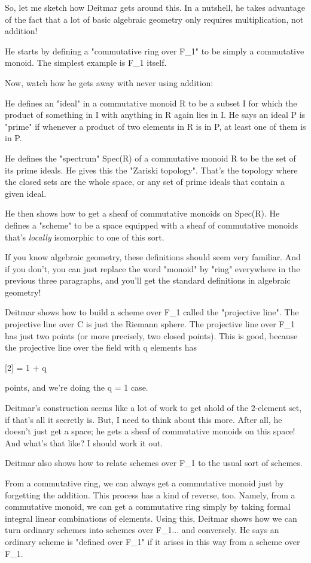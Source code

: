 So, let me sketch how Deitmar gets around this.  In a nutshell, he takes
advantage of the fact that a lot of basic algebraic geometry only requires 
multiplication, not addition!

He starts by defining a "commutative ring over
F_{1}" to be simply a commutative monoid.  The simplest
example is F_{1} itself.

Now, watch how he gets away with never using addition:

He defines an "ideal" in a commutative monoid R to be a
subset I for which the product of something in I with anything in R
again lies in I.  He says an ideal P is "prime" if whenever
a product of two elements in R is in P, at least one of them is in P.

He defines the "spectrum" Spec(R) of a commutative monoid R
to be the set of its prime ideals.  He gives this the "Zariski
topology".  That's the topology where the closed sets are the
whole space, or any set of prime ideals that contain a given ideal.

He then shows how to get a sheaf of commutative monoids on Spec(R).
He defines a "scheme" to be a space equipped with a sheaf of 
commutative monoids that's \emph{locally} isomorphic to one of this sort. 

If you know algebraic geometry, these definitions should seem very
familiar.  And if you don't, you can just replace the word "monoid"
by "ring" everywhere in the previous three paragraphs, and you'll get
the standard definitions in algebraic geometry!

Deitmar shows how to build a scheme over F_{1} called the
"projective line".  The projective line over C is just the
Riemann sphere.  The projective line over F_{1} has just two
points (or more precisely, two closed points).  This is good, because
the projective line over the field with q elements has

[2] = 1 + q

points, and we're doing the q = 1 case.  

Deitmar's construction seems like a lot of work to get ahold of the 
2-element set, if that's all it secretly is.  But, I need to think 
about this more.  After all, he doesn't just get a space; he gets a 
sheaf of commutative monoids on this space!  And what's that like?
I should work it out.

Deitmar also shows how to relate schemes over F_{1} to the usual sort
of schemes.

From a commutative ring, we can always get a commutative monoid just
by forgetting the addition.  This process has a kind of reverse, too.
Namely, from a commutative monoid, we can get a commutative ring 
simply by taking formal integral linear combinations of elements.  
Using this, Deitmar shows how we can turn ordinary schemes into 
schemes over F_{1}... and conversely.  He says an ordinary scheme is 
"defined over F_{1}" if it arises in this way from a scheme over F_{1}.  

